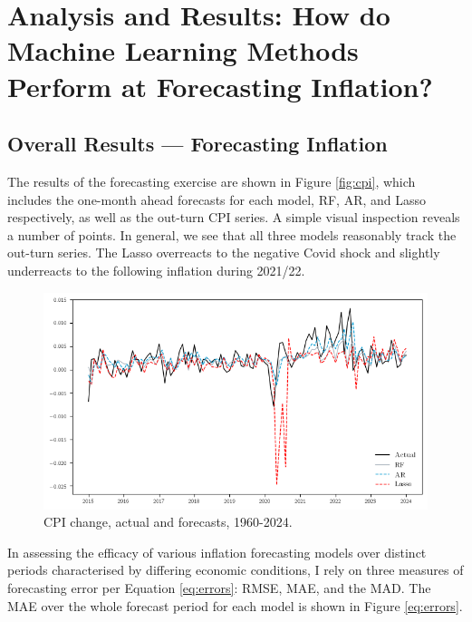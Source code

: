 \section{Analysis and Results: How do Machine Learning Methods Perform at Forecasting Inflation?} \label{sec:analysis}

\subsection{Overall Results — Forecasting Inflation} \label{sec:analysis_results}

The results of the forecasting exercise are shown in Figure \ref{fig:cpi}, which includes the one-month ahead forecasts for each model, RF, AR, and Lasso respectively, as well as the out-turn CPI series. A simple visual inspection reveals a number of points. In general, we see that all three models reasonably track the out-turn series. The Lasso overreacts to the negative Covid shock and slightly underreacts to the following inflation during 2021/22.

\begin{figure}[H]
    \centering
    \includegraphics[width=1\linewidth]{figures/forecasts.png}
    \vspace{-30pt}
    \caption{CPI change, actual and forecasts, 1960-2024.}
    \label{fig:forecasts} 
\end{figure}

In assessing the efficacy of various inflation forecasting models over distinct periods characterised by differing economic conditions, I rely on three measures of forecasting error per Equation \ref{eq:errors}: RMSE, MAE, and the MAD. The MAE over the whole forecast period for each model is shown in Figure \ref{eq:errors}.

